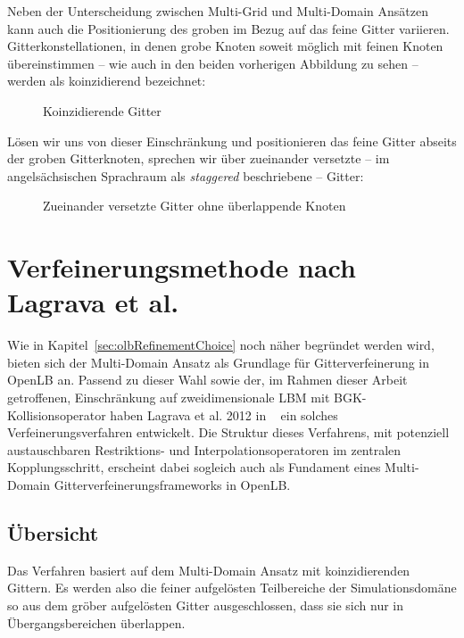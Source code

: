 Neben der Unterscheidung zwischen Multi-Grid und Multi-Domain Ansätzen kann auch die Positionierung des groben im Bezug auf das feine Gitter variieren. Gitterkonstellationen, in denen grobe Knoten soweit möglich mit feinen Knoten übereinstimmen -- wie auch in den beiden vorherigen Abbildung zu sehen -- werden als koinzidierend bezeichnet:

\begin{figure}[h]
\centering

\caption{Koinzidierende Gitter}
\label{fig:CoincidingGrid}
\end{figure}

\noindent
Lösen wir uns von dieser Einschränkung und positionieren das feine Gitter abseits der groben Gitterknoten, sprechen wir über zueinander versetzte -- im angelsächsischen Sprachraum als \emph{staggered} beschriebene -- Gitter:

\begin{figure}[h]
\centering

\caption{Zueinander versetzte Gitter ohne überlappende Knoten}
\label{fig:StaggeredGrid}
\end{figure}

\newpage
\section{Verfeinerungsmethode nach Lagrava et al.}\label{kap:Lagrava}

Wie in Kapitel~\ref{sec:olbRefinementChoice} noch näher begründet werden wird, bieten sich der Multi-Domain Ansatz als Grundlage für Gitterverfeinerung in OpenLB an. Passend zu dieser Wahl sowie der, im Rahmen dieser Arbeit getroffenen, Einschränkung auf zweidimensionale LBM mit BGK-Kollisionsoperator haben Lagrava et al. 2012 in ~\cite{Lagrava12} ein solches Verfeinerungsverfahren entwickelt. Die Struktur dieses Verfahrens, mit potenziell austauschbaren Restriktions- und Interpolationsoperatoren im zentralen Kopplungsschritt, erscheint dabei sogleich auch als Fundament eines Multi-Domain Gitterverfeinerungsframeworks in OpenLB.

\subsection{Übersicht}

Das Verfahren basiert auf dem Multi-Domain Ansatz \cite[Kap.~3.1]{Lagrava12} mit koinzidierenden Gittern. Es werden also die feiner aufgelösten Teilbereiche der Simulationsdomäne so aus dem gröber aufgelösten Gitter ausgeschlossen, dass sie sich nur in Übergangsbereichen überlappen.

